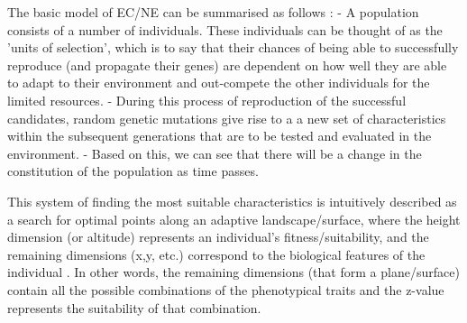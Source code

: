 

The basic model of EC/NE can be summarised as follows \cite{EibenSmith2003}:
- A population consists of a number of individuals. These individuals can be thought of as the 'units of selection', which is to say that their chances of being able to successfully reproduce (and propagate their genes) are dependent on how well they are able to adapt to their environment and out-compete the other individuals for the limited resources.
- During this process of reproduction of the successful candidates, random genetic mutations give rise to a a new set of characteristics within the subsequent generations that are to be tested and evaluated in the environment.
- Based on this, we can see that there will be a change in the constitution of the population as time passes.



This system of finding the most suitable characteristics is intuitively described as a search for optimal points along an adaptive landscape/surface, where the height dimension (or altitude) represents an individual's fitness/suitability, and the remaining dimensions (x,y, etc.) correspond to the biological features of the individual \cite{EibenSmith2003}. 
In other words, the remaining dimensions (that form a plane/surface) contain all the possible combinations of the phenotypical traits and the z-value represents the suitability of that combination.

